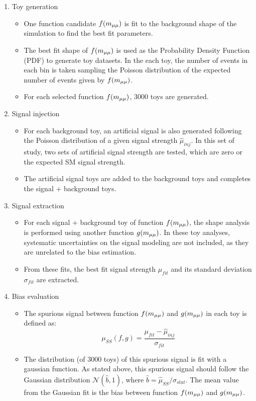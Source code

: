 \begin{enumerate}
  \item Toy generation
  \begin{itemize}
    \item One function candidate $f(m_{\mu\mu})$ is fit to the background shape of the simulation to find the best fit parameters.
    \item The best fit shape of $f(m_{\mu\mu})$ is used as the Probability Density Function (PDF) to generate toy datasets. 
          In the each toy, the number of events in each bin is taken sampling the Poisson distribution of the expected number of events given by $f(m_{\mu\mu})$. 
    \item For each selected function $f(m_{\mu\mu})$, 3000 toys are generated.      
  \end{itemize}

  \item Signal injection
  \begin{itemize}
    \item For each background toy, an artificial signal is also generated following the Poisson distribution of a given signal strength $\hat{\mu}_{inj}$. 
          In this set of study, two sets of artificial signal strength are tested, which are zero or the expected SM signal strength.
    \item The artificial signal toys are added to the background toys and completes the signal + background toys.
  \end{itemize}
  
  \item Signal extraction
  \begin{itemize}
    \item For each signal + background toy of function $f(m_{\mu\mu})$, the shape analysis is performed using another function $g(m_{\mu\mu})$.
          In these toy analyses, systematic uncertainties on the signal modeling are not included, as they are unrelated to the bias estimation. 
    \item From these fits, the best fit signal strength $\mu_{fit}$ and its standard deviation $\sigma_{fit}$ are extracted.
  \end{itemize}

  \item Bias evaluation
  \begin{itemize}
    \item The spurious signal between function $f(m_{\mu\mu})$ and $g(m_{\mu\mu})$ in each toy is defined as: 
          \begin{equation}\label{eq:bias}
            \mu_{SS}(f, g) = \frac{\mu_{fit}-\hat{\mu}_{inj}}{\sigma_{fit}}
          \end{equation}
    \item The distribution (of 3000 toys) of this spurious signal is fit with a gaussian function. 
          As stated above, this spurious signal should follow the Gaussian distribution $\mathcal{N}(\hat{b}, 1)$,
          where $\hat{b} = \hat{\mu}_{SS} / \sigma_{stat}$.
          The mean value from the Gaussian fit is the bias between function $f(m_{\mu\mu})$ and $g(m_{\mu\mu})$.
  \end{itemize}
\end{enumerate}



